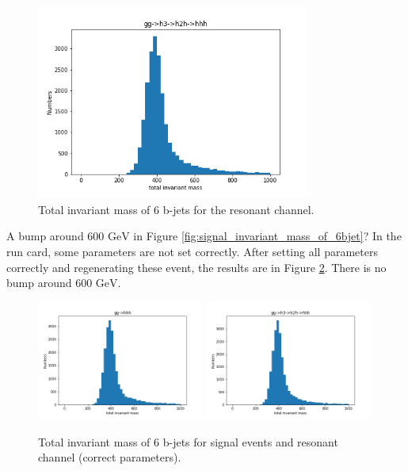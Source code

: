 \documentclass[12pt]{article}
\begin{document}
	\begin{figure}[htpb]
		\centering
		\includegraphics[width=0.8\textwidth]{signal_resonant_6_b-jets_total_invariant_mass.png}
		\caption{Total invariant mass of 6 b-jets for the resonant channel.}
		\label{fig:resonant_channel_invariant_mass_of_6bjet}
	\end{figure}

	A bump around $\text{600 GeV}$ in Figure \ref{fig:signal_invariant_mass_of_6bjet}? In the run card, some parameters are not set correctly. After setting all parameters correctly and regenerating these event, the results are in Figure \ref{fig:invariant_mass_of_6bjet_correct}. There is no bump around $\text{600 GeV}$.

	\begin{figure}[htpb]
		\centering
		\includegraphics[width=0.49\textwidth]{signal_6_b-jets_total_invariant_mass_correct.png}
		\includegraphics[width=0.49\textwidth]{signal_resonant_6_b-jets_total_invariant_mass_correct.png}
		\caption{Total invariant mass of 6 b-jets for signal events and resonant channel (correct parameters).}
		\label{fig:invariant_mass_of_6bjet_correct}
	\end{figure}
\end{document}
